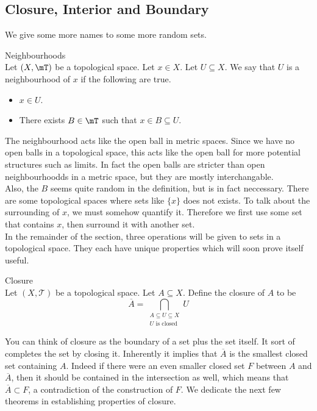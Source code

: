 \documentclass[a4paper]{article}
\begin{document}
\subsection{Closure, Interior and Boundary}
We give some more names to some more random sets. 
\begin{defn}{Neighbourhoods}{}\\
Let $(X,\mT)$ be a topological space. Let $x\in X$. Let $U\subseteq X$. We say that $U$ is a neighbourhood of $x$ if the following are true. 
\begin{itemize}
\item $x\in U$. 
\item There exists $B\in\mT$ such that $x\in B\subseteq U$. 
\end{itemize}
\end{defn}

The neighbourhood acts like the open ball in metric spaces. Since we have no open balls in a topological space, this acts like the open ball for more potential structures such as limits. In fact the open balls are stricter than open neighbourhoodds in a metric space, but they are mostly interchangable. \\
Also, the $B$ seems quite random in the definition, but is in fact neccessary. There are some topological spaces where sets like $\{x\}$ does not exists. To talk about the surrounding of $x$, we must somehow quantify it. Therefore we first use some set that contains $x$, then surround it with another set. \\

In the remainder of the section, three operations will be given to sets in a topological space. They each have unique properties which will soon prove itself useful. 

\begin{defn}{Closure}{}\\
Let $(X,\mathcal{T})$ be a topological space. Let $A\subseteq X$. Define the closure of $A$ to be $$\overline{A}=\bigcap_{\substack{A\subseteq U\subseteq X\\U\text{ is closed}}}U$$
\end{defn}

You can think of closure as the boundary of a set plus the set itself.  It sort of completes the set by closing it. Inherently it implies that $\overline{A}$ is the smallest closed set containing $A$. Indeed if there were an even smaller closed set $F$ between $A$ and $\overline{A}$, then it should be contained in the intersection as well, which means that $\overline{A}\subset F$, a contradiction of the construction of $F$. We dedicate the next few theorems in establishing properties of closure. 
\end{document}
